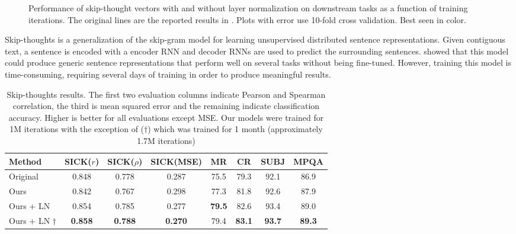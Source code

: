 \documentclass{article}
\begin{document}
\begin{figure}
  \caption{Performance of skip-thought vectors with and without layer normalization on downstream tasks as a function of training iterations. The original lines are the reported results in \citep{kiros2015skip}. Plots with error use 10-fold cross validation. Best seen in color.}
\label{fig:skipthoughts}
\end{figure}

Skip-thoughts \citep{kiros2015skip} is a generalization of the skip-gram model \citep{mikolov2013efficient} for learning unsupervised distributed sentence representations. Given contiguous text, a sentence is encoded with a encoder RNN and decoder RNNs are used to predict the surrounding sentences. \citet{kiros2015skip} showed that this model could produce generic sentence representations that perform well on several tasks without being fine-tuned. However, training this model is time-consuming, requiring several days of training in order to produce meaningful results.

\begin{table}
\small
\centering
\begin{tabular}{lccccccc}
\toprule \bf Method & \bf SICK($r$) & \bf SICK($\rho$) & {\bf SICK(}MSE{\bf)} & \bf MR & \bf CR & \bf SUBJ & \bf MPQA \\ \midrule
Original \citep{kiros2015skip} & 0.848 & 0.778 & 0.287 & 75.5 & 79.3 & 92.1 & 86.9  \\ \midrule
Ours & 0.842 & 0.767 & 0.298 & 77.3 & 81.8 & 92.6 & 87.9  \\
Ours + LN & 0.854 & 0.785 & 0.277 & {\bf 79.5} & 82.6 & 93.4 & 89.0   \\
Ours + LN $\dagger$ & {\bf 0.858} & {\bf 0.788} & {\bf 0.270} & 79.4 & {\bf 83.1} & {\bf 93.7} & {\bf 89.3}   \\ \bottomrule
\end{tabular}
    ~\\[-.05in]
\caption{Skip-thoughts results. The first two evaluation columns indicate Pearson and Spearman correlation, the third is mean squared error and the remaining indicate classification accuracy. Higher is better for all evaluations except MSE. Our models were trained for 1M iterations with the exception of ($\dagger$) which was trained for 1 month (approximately 1.7M iterations)}
\label{tab:skipthoughts}
\end{table}
\end{document}
